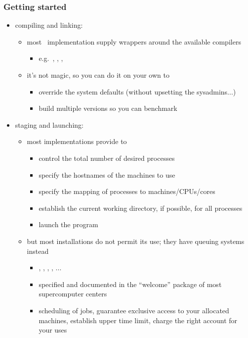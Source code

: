 \begin{frame}[fragile]
%
  \frametitle{Getting started}
%
  \begin{itemize}
%
  \item compiling and linking:
    \begin{itemize}
    \item most \mpi\ implementation supply wrappers around the available compilers
      \begin{itemize}
      \item e.g.~, , ,
      \end{itemize}
    \item it's not magic, so you can do it on your own to
      \begin{itemize}
      \item override the system defaults (without upsetting the sysadmins...)
      \item build multiple versions so you can benchmark
      \end{itemize}
    \end{itemize}
%
  \item staging and launching:
    \begin{itemize}
    \item most implementations provide  to
      \begin{itemize}
      \item control the total number of desired processes
      \item specify the hostnames of the machines to use
      \item specify the mapping of processes to machines/CPUs/cores
      \item establish the current working directory, if possible, for all processes
      \item launch the program
      \end{itemize}
%
    \item but most installations do not permit its use; they have queuing systems instead
      \begin{itemize}
      \item {}, , , , ...
      \item specified and documented in the ``welcome'' package of most supercomputer centers
      \item scheduling of jobs, guarantee exclusive access to your allocated machines,
        establish upper time limit, charge the right account for your uses
      \end{itemize}
    \end{itemize}
%
  \end{itemize}
%
\end{frame}

